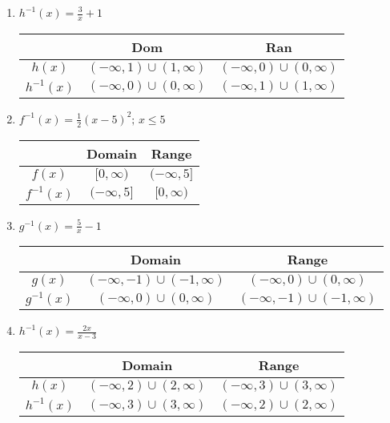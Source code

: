 \begin{enumerate}
\item $h^{-1}(x) = \frac{3}{x} + 1$ \newline\\
    \setlength{\extrarowheight}{5pt}
    \begin{tabular}{c|c|c}
            &   Dom &   Ran \\  \hline
        $h(x)$  &   $(-\infty, 1) \cup (1, \infty)$  &   $(-\infty, 0) \cup (0, \infty)$    \\[5pt]  \hline
        $h^{-1}(x)$ &   $(-\infty, 0) \cup (0, \infty)$   &   $(-\infty, 1) \cup (1, \infty)$  \\
        \end{tabular}
        
\newpage 
        
\item $f^{-1}(x) = \frac{1}{2}(x-5)^2; \, x \leq 5$ \newline\\
    
    \begin{tabular}{c|c|c}
                    &   Domain      & Range             \\ \hline
        $f(x)$      & $[0,\infty)$  &   $(-\infty, 5]$  \\  \hline   
        $f^{-1}(x)$ & $(-\infty,5]$ &   $[0,\infty)$  
    \end{tabular}
    
    \item $g^{-1}(x) = \frac{5}{x}-1$   \newline\\
    
    \begin{tabular}{c|c|c}
                    &   Domain      & Range             \\ \hline
        $g(x)$      & $(-\infty,-1)\cup(-1,\infty)$  &   $(-\infty,0)\cup(0,\infty)$  \\  \hline   
        $g^{-1}(x)$ & $(-\infty,0)\cup(0,\infty)$ &   $(-\infty,-1)\cup(-1,\infty)$  
    \end{tabular}
    
    \item $h^{-1}(x) = \frac{2x}{x-3}$    \newline\\
    
    \begin{tabular}{c|c|c}
                    &   Domain      & Range             \\ \hline
        $h(x)$      & $(-\infty,2)\cup(2,\infty)$  &   $(-\infty,3)\cup(3,\infty)$  \\  \hline   
        $h^{-1}(x)$ & $(-\infty,3)\cup(3,\infty)$ &   $(-\infty,2)\cup(2,\infty)$  
    \end{tabular}

    



\end{enumerate}